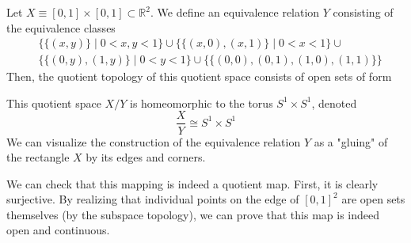     \begin{example}
    Let $X \equiv [0,1] \times [0,1] \subset \mathbb{R}^2$. We define an equivalence relation $Y$ consisting of the equivalence classes
    \begin{align*}
        &\big\{\{(x, y)\} \; | \; 0<x, y<1\big\} \cup \big\{ \{(x, 0), (x,1)\} \; | \; 0<x<1 \big\} \cup \\
        &\big\{ \{(0,y), (1,y)\} \; | \; 0<y<1 \big\} \cup \big\{ \{(0,0), (0,1), (1,0), (1,1)\} \big\}
    \end{align*}
    Then, the quotient topology of this quotient space consists of open sets of form
    \begin{center}
    \end{center}
    This quotient space $X / Y$ is homeomorphic to the torus $S^1 \times S^1$, denoted
    \[\frac{X}{Y} \cong S^1 \times S^1\]
    We can visualize the construction of the equivalence relation $Y$ as a "gluing" of the rectangle $X$ by its edges and corners. 

    We can check that this mapping is indeed a quotient map. First, it is clearly surjective. By realizing that individual points on the edge of $[0,1]^2$ are open sets themselves (by the subspace topology), we can prove that this map is indeed open and continuous. 
    \end{example}

